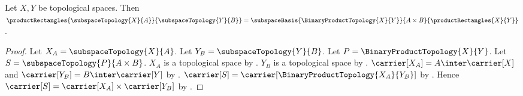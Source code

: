 \begin{theorem}\label{product_rectangles_of_subspaces}
    Let $X,Y$ be topological spaces.
    Then
        $\productRectangles{
            \subspaceTopology{X}{A}}{\subspaceTopology{Y}{B}}
        =\subspaceBasis{\BinaryProductTopology{X}{Y}}{A\times B}{
            \productRectangles{X}{Y}}$.
\end{theorem}
\begin{proof}
    Let $X_A=\subspaceTopology{X}{A}$.
    Let $Y_B=\subspaceTopology{Y}{B}$.
    Let $P=\BinaryProductTopology{X}{Y}$.
    Let $S=\subspaceTopology{P}{A\times B}$.
    $X_A$ is a topological space by
        .
    $Y_B$ is a topological space by
        .
    $\carrier[X_A]=A\inter\carrier[X]$ and
        $\carrier[Y_B]=B\inter\carrier[Y]$ by
        .
    $\carrier[S]
        =\carrier[\BinaryProductTopology{X_A}{Y_B}]$ by
        .
    Hence $\carrier[S]=\carrier[X_A]\times\carrier[Y_B]$ by
        .


\end{proof}
